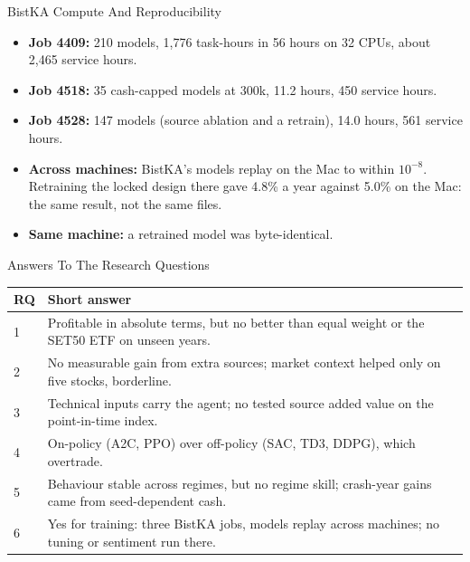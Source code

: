 \begin{frame}{BistKA Compute And Reproducibility}
\begin{itemize}
  \item \textbf{Job 4409:} 210 models, 1{,}776 task-hours in 56 hours on 32 CPUs, about 2{,}465 service hours.
  \item \textbf{Job 4518:} 35 cash-capped models at 300k, 11.2 hours, 450 service hours.
  \item \textbf{Job 4528:} 147 models (source ablation and a retrain), 14.0 hours, 561 service hours.
  \item \textbf{Across machines:} BistKA's models replay on the Mac to within $10^{-8}$. Retraining the locked design there gave 4.8\% a year against 5.0\% on the Mac: the same result, not the same files.
  \item \textbf{Same machine:} a retrained model was byte-identical.
\end{itemize}
\end{frame}

\begin{frame}{Answers To The Research Questions}
\begin{center}
\scriptsize
\begin{tabular}{p{}p{}}
\toprule
RQ & Short answer \\
\midrule
1 & Profitable in absolute terms, but no better than equal weight or the SET50 ETF on unseen years. \\
2 & No measurable gain from extra sources; market context helped only on five stocks, borderline. \\
3 & Technical inputs carry the agent; no tested source added value on the point-in-time index. \\
4 & On-policy (A2C, PPO) over off-policy (SAC, TD3, DDPG), which overtrade. \\
5 & Behaviour stable across regimes, but no regime skill; crash-year gains came from seed-dependent cash. \\
6 & Yes for training: three BistKA jobs, models replay across machines; no tuning or sentiment run there. \\
\bottomrule
\end{tabular}
\end{center}
\end{frame}

